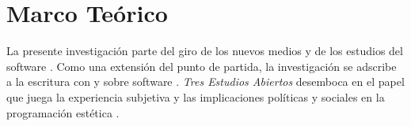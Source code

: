 \section*{Marco Teórico}

La presente investigación parte del giro de los nuevos medios y de los estudios del software \citep{manovichlanguage}. Como una extensión del punto de partida, la investigación se adscribe a la escritura con y sobre software \citep{aestheticProgramming}. \textit{Tres Estudios Abiertos} desemboca en el papel que juega la experiencia subjetiva y las implicaciones políticas y sociales en la programación estética \citep{speakingCode}. 

